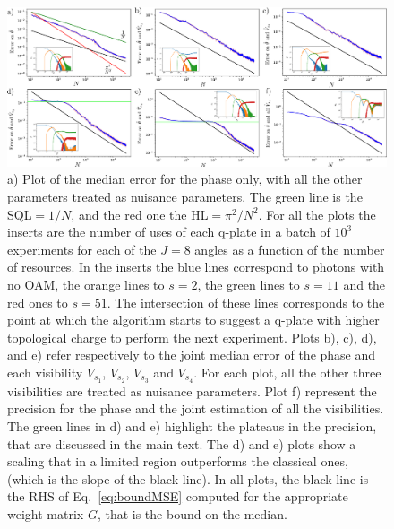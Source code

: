 \documentclass[aps,pra,twocolumn,notitlepage,superscriptaddress]{revtex4-1}
\begin{document}
\begin{figure}[!htb]
	\includegraphics[width=\textwidth]{precision_and_inserts.pdf}
	\caption{a) Plot of the median error for the phase only, with all the other parameters treated as nuisance parameters. The green line is the SQL$=1/N$, and the red one the HL$=\pi^2/N^2$. For all the plots the inserts are the number of uses of each q-plate in a batch of $10^3$ experiments for each of the $J=8$ angles as a function of the number of resources. In the inserts the blue lines correspond to photons with no OAM, the orange lines to $s=2$, the green lines to $s=11$ and the red ones to $s=51$. The intersection of these lines corresponds to the point at which the algorithm starts to suggest a q-plate with higher topological charge to perform the next experiment. Plots b), c), d), and e) refer respectively to the joint median error of the phase and each visibility $V_{s_1}$, $V_{s_2}$, $V_{s_3}$ and $V_{s_4}$. For each plot, all the other three visibilities are treated as nuisance parameters. Plot f) represent the precision for the phase and the joint estimation of all the visibilities. The green lines in d) and e) highlight the plateaus in the precision, that are discussed in the main text. The d) and e) plots show a scaling that in a limited region outperforms the classical ones, (which is the slope of the black line). In all plots, the black line is the RHS of Eq.~\eqref{eq:boundMSE} computed for the appropriate weight matrix $G$, that is the bound on the median.}
	\label{fig:phase}
\end{figure}
%
\end{document}
